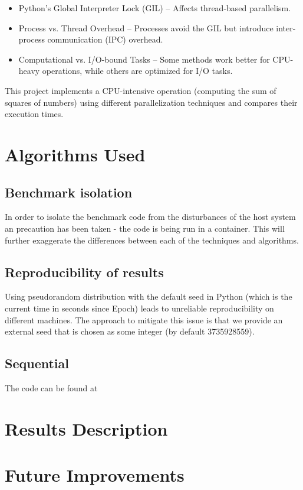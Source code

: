 \documentclass[a4paper, oneside]{article}
\begin{document}
\begin{itemize}
    \item Python’s Global Interpreter Lock (GIL) – Affects thread-based parallelism.
    \item Process vs. Thread Overhead – Processes avoid the GIL but introduce inter-process communication (IPC) overhead.
    \item Computational vs. I/O-bound Tasks – Some methods work better for CPU-heavy operations, while others are optimized for I/O tasks.
\end{itemize}

This project implements a CPU-intensive operation (computing the sum of squares of numbers) using different parallelization techniques and compares their execution times.

\section{Algorithms Used}
\subsection{Benchmark isolation}
In order to isolate the benchmark code from the disturbances of the host system an precaution has been taken - the code is being run in a container. This will further exaggerate the differences between each of the techniques and algorithms.

\subsection{Reproducibility of results}
Using pseudorandom distribution with the default seed in Python (which is the current time in seconds since Epoch) leads to unreliable reproducibility on different machines. The approach to mitigate this issue is that we provide an external seed that is chosen as some integer (by default 3735928559).

\subsection{Sequential}
The code can be found at 

\section{Results Description}
\section{Future Improvements}
\end{document}
